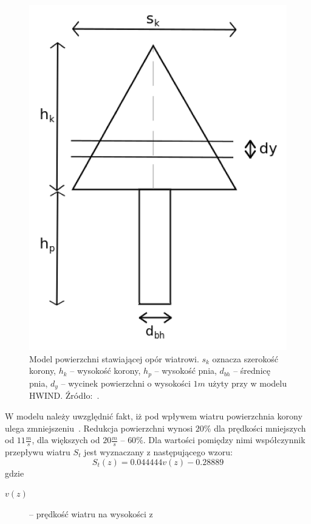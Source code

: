 \begin{figure}[!h]
\center
\includegraphics[scale=0.35]{HWIND2}
\caption{Model powierzchni stawiającej opór wiatrowi. $s_k$ oznacza szerokość korony, $h_k$ -- wysokość korony, $h_p$ -- wysokość pnia, $d_{bh}$ -- średnicę pnia, $d_y$ -- wycinek powierzchni o wysokości $1m$ użyty przy w modelu HWIND. Źródło:~\cite{chm_mgza}.}
\label{fig:hwind_area}
\end{figure} 

W modelu należy uwzględnić fakt, iż pod wpływem wiatru powierzchnia korony ulega zmniejszeniu~\cite{hpsk_hwind}. Redukcja powierzchni wynosi $20\%$ dla prędkości mniejszych od $11 \frac{m}{s}$, dla 
większych od $20\frac{m}{s}$ -- $60\%$. Dla wartości pomiędzy nimi współczynnik przepływu wiatru $S_t$ jest wyznaczany z następującego wzoru:
\begin{equation}
\label{eq:windFlow}
	 S_t(z) = 0.044444v(z) - 0.28889
\end{equation}
gdzie
\begin{description}
	\item[$v(z)$] -- prędkość wiatru na wysokości z
\end{description}

